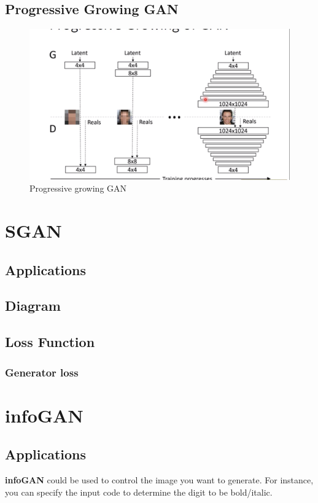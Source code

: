 \documentclass{article}
\begin{document}
\subsection{Progressive Growing GAN}
\begin{figure}[H]
    \centering
    \includegraphics[width=\linewidth]{ProgressiveGAN}
    \caption{Progressive growing GAN}
\end{figure}
\section{SGAN}
\subsection{Applications}
\subsection{Diagram}
\subsection{Loss Function}
\subsubsection{Generator loss}
\section{infoGAN}
\subsection{Applications}
\textbf{infoGAN} could be used to control the image you want to generate. For instance, you can specify the input code to determine the digit to be bold/italic.
\end{document}

